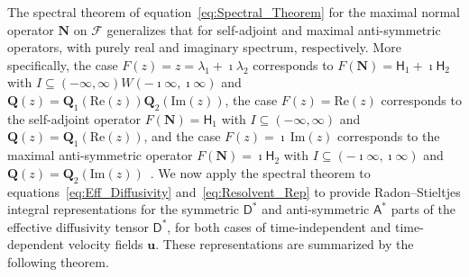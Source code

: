 \documentclass[leqno,onefignum,onetabnum]{siamltex1213}
\newcommand{\Qb}{\mathbf{Q}}
\newcommand{\Nb}{\mathbf{N}}
\newcommand{\Fc}{\mathcal{F}}
\newcommand{\Dm}{\mathsf{D}}
\newcommand{\Hm}{\mathsf{H}}
\newcommand{\Am}{\mathsf{A}}
\newcommand{\vecu}{\boldsymbol{u}}
\begin{document}
 

The spectral theorem of equation~\eqref{eq:Spectral_Theorem} for the
maximal normal operator $\Nb$ on $\Fc$ generalizes that for
self-adjoint and maximal anti-symmetric operators, with purely real
and imaginary spectrum, respectively. More specifically, the case
$F(z)=z=\lambda_1+\imath\lambda_2$ corresponds to $F(\Nb)=\Hm_1+\imath\Hm_2$ with
$I\subseteq(-\infty,\infty)W(-\imath\infty,\imath\infty)$ and
$\Qb(z)=\Qb_1(\text{Re}(z))\Qb_2(\text{Im}(z))$, the case
$F(z)=\text{Re}(z)$ corresponds to the self-adjoint operator   
$F(\Nb)=\Hm_1$ with $I\subseteq(-\infty,\infty)$ and $\Qb(z)=\Qb_1(\text{Re}(z))$,
and the case $F(z)=\imath\,\text{Im}(z)$ corresponds to the maximal
anti-symmetric operator $F(\Nb)=\imath\Hm_2$ with $I\subseteq(-\imath\infty,\imath\infty)$ and
$\Qb(z)=\Qb_2(\text{Im}(z))$~\cite{Stone:64}. We now apply the
spectral theorem to equations~\eqref{eq:Eff_Diffusivity}
and~\eqref{eq:Resolvent_Rep} to provide Radon--Stieltjes integral 
representations for the symmetric $\Dm^*$ and anti-symmetric
$\Am^*$ parts of the effective diffusivity tensor $\Dm^*$, for
both cases of time-independent and time-dependent velocity fields
$\vecu $. These representations are summarized by the following
theorem.  
%
\end{document}
